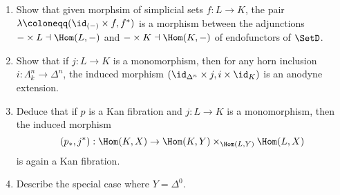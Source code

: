 \begin{Exercise}
    
\begin{enumerate}[label=(\alph*)]
    \item 
    Show that given morphsim of simplicial sets $ f : L \to K $, the pair $ \lambda \coloneqq ( \id_{(-)} \times f , f^* ) $ is a morphism between the adjunctions $ - \times L \dashv \Hom ( L , - ) $ and $ - \times K \dashv \Hom ( K , - ) $ of endofunctors of $ \SetD $.

    \item 
    Show that if $ j : L \to K $ is a monomorphism, then for any horn inclusion $ i : \Lambda_k^n \to \Delta^n $, the induced morphism $ ( \id_{ \Delta^n } \times j , i \times \id_K ) $ is an anodyne extension.

    \item 
    Deduce that if $ p $ is a Kan fibration and $ j : L \to K $ is a monomorphism, then the induced morphism
    \[
        ( p_* , j^* ): \Hom( K , X ) \to \Hom ( K , Y ) \times_{ \Hom ( L , Y ) } \Hom ( L , X )
    \]
    is again a Kan fibration.

    \item  
    Describe the special case where $ Y = \Delta^0 $.
    
\end{enumerate}
\end{Exercise}

